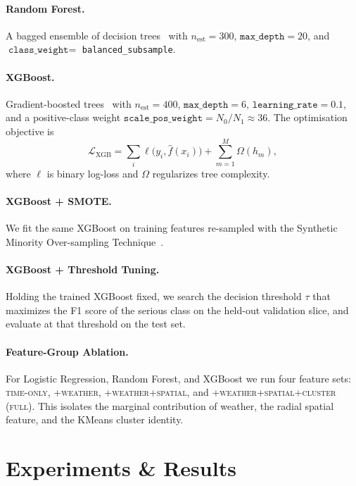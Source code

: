 \documentclass{article}
\begin{document}
\paragraph{Random Forest.} A bagged ensemble of decision
trees~\cite{breiman2001random} with $n_{\text{est}}\!=\!300$,
$\texttt{max\_depth}\!=\!20$, and $\texttt{class\_weight}\!=\!$
\texttt{balanced\_subsample}.

\paragraph{XGBoost.} Gradient-boosted trees~\cite{chen2016xgboost} with
$n_{\text{est}}\!=\!400$, $\texttt{max\_depth}\!=\!6$,
$\texttt{learning\_rate}\!=\!0.1$, and a positive-class weight
$\texttt{scale\_pos\_weight} = N_0/N_1 \approx 36$. The optimisation objective
is
\begin{equation}
\mathcal{L}_{\text{XGB}} = \sum_i \ell\bigl(y_i, \hat{f}(x_i)\bigr) + \sum_{m=1}^{M} \Omega(h_m),
\label{eq:xgb}
\end{equation}
where $\ell$ is binary log-loss and $\Omega$ regularizes tree complexity.

\paragraph{XGBoost + SMOTE.} We fit the same XGBoost on training features
re-sampled with the Synthetic Minority Over-sampling
Technique~\cite{chawla2002smote}.

\paragraph{XGBoost + Threshold Tuning.} Holding the trained XGBoost fixed, we
search the decision threshold $\tau$ that maximizes the F1 score of the
serious class on the held-out validation slice, and evaluate at that threshold
on the test set.

\paragraph{Feature-Group Ablation.} For Logistic Regression, Random Forest, and
XGBoost we run four feature sets:
\textsc{time-only}, \textsc{+weather}, \textsc{+weather+spatial},
and \textsc{+weather+spatial+cluster (full)}. This isolates the marginal
contribution of weather, the radial spatial feature, and the KMeans cluster
identity.

\section{Experiments \& Results}
\label{sec:results}
\end{document}
